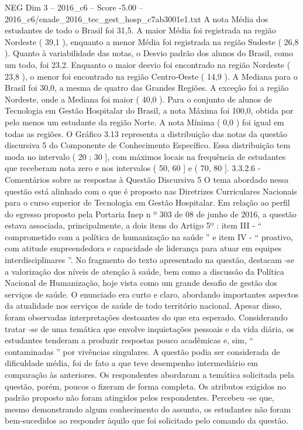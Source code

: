 \begin{textsample}{NEG Dim 3 – 2016\_c6 – Score -5.00 – 2016\_c6/enade\_2016\_tec\_gest\_hosp\_c7ab3001e1.txt}
A nota Média dos estudantes de todo o Brasil foi 31,5.
A maior Média foi registrada na região Nordeste ( 39,1 ), enquanto a menor Média foi registrada na região Sudeste ( 26,8 ).
Quanto à variabilidade das notas, o Desvio padrão dos alunos do Brasil, como um todo, foi 23,2.
Enquanto o maior desvio foi encontrado na região Nordeste ( 23,8 ), o menor foi encontrado na região Centro-Oeste ( 14,9 ).
A Mediana para o Brasil foi 30,0, a mesma de quatro das Grandes Regiões.
A exceção foi a região Nordeste, onde a Mediana foi maior ( 40,0 ).
Para o conjunto de alunos de Tecnologia em Gestão Hospitalar do Brasil, a nota Máxima foi 100,0, obtida por pelo menos um estudante da região Norte.
A nota Mínima ( 0,0 ) foi igual em todas as regiões.
O Gráfico 3.13 representa a distribuição das notas da questão discursiva 5 do Componente de Conhecimento Específico.
Essa distribuição tem moda no intervalo ( 20 ; 30 ], com máximos locais na frequência de estudantes que receberam nota zero e nos intervalos ( 50, 60 ] e ( 70, 80 ]. 3.3.2.6 - Comentários sobre as respostas à Questão Discursiva 5 O tema abordado nessa questão está alinhado com o que é proposto nas Diretrizes Curriculares Nacionais para o curso superior de Tecnologia em Gestão Hospitalar.
Em relação ao perfil do egresso proposto pela Portaria Inep n º 303 de 08 de junho de 2016, a questão estava associada, principalmente, a dois itens do Artigo 5º : item III - “ comprometido com a política de humanização na saúde ” e item IV - “ proativo, com atitude empreendedora e capacidade de liderança para atuar em equipes interdisciplinares ”.
No fragmento do texto apresentado na questão, destacam -se a valorização dos níveis de atenção à saúde, bem como a discussão da Política Nacional de Humanização, hoje vista como um grande desafio de gestão dos serviços de saúde.
O enunciado era curto e claro, abordando importantes aspectos da atualidade nos serviços de saúde de todo território nacional.
Apesar disso, foram observadas interpretações destoantes do que era esperado.
Considerando tratar -se de uma temática que envolve inquietações pessoais e da vida diária, os estudantes tenderam a produzir respostas pouco acadêmicas e, sim, “ contaminadas ” por vivências singulares.
A questão podia ser considerada de dificuldade média, foi de fato a que teve desempenho intermediário em comparação às anteriores.
Os respondentes abordaram a temática solicitada pela questão, porém, poucos o fizeram de forma completa.
Os atributos exigidos no padrão proposto não foram atingidos pelos respondentes.
Percebeu -se que, mesmo demonstrando algum conhecimento do assunto, os estudantes não foram bem-sucedidos ao responder àquilo que foi solicitado pelo comando da questão.

\end{textsample}
